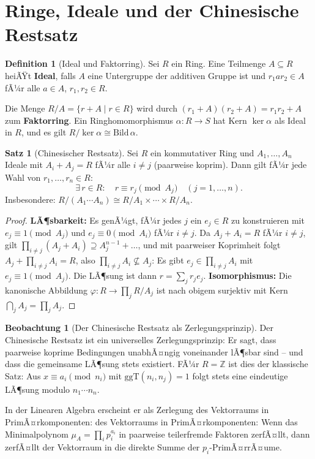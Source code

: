 ﻿\documentclass[a4paper,12pt]{report}
\theoremstyle{definition}
\newtheorem{definition}{Definition}
\newtheorem{satz}{Satz}
\newtheorem{beobachtung}{Beobachtung}
\begin{document}
\section{Ringe, Ideale und der Chinesische Restsatz}

\begin{definition}[Ideal und Faktorring]
    Sei $R$ ein Ring. Eine Teilmenge $A \subseteq R$ heiÃŸt \textbf{Ideal},
    falls $A$ eine Untergruppe der additiven Gruppe ist und
    $r_1 a r_2 \in A$ fÃ¼r alle $a \in A$, $r_1, r_2 \in R$.

    Die Menge $R/A = \{r + A \mid r \in R\}$ wird durch
    $(r_1 + A)(r_2 + A) = r_1 r_2 + A$ zum \textbf{Faktorring}.
    Ein Ringhomomorphismus $\alpha : R \to S$ hat Kern $\ker \alpha$
    als Ideal in $R$, und es gilt $R/\ker\alpha \cong \mathrm{Bild}\,\alpha$.
\end{definition}

\begin{satz}[Chinesischer Restsatz]
    Sei $R$ ein kommutativer Ring und $A_1, \dots, A_n$ Ideale mit
    $A_i + A_j = R$ fÃ¼r alle $i \neq j$ (paarweise koprim).
    Dann gilt fÃ¼r jede Wahl von $r_1, \dots, r_n \in R$:
    \[
        \exists\, r \in R : \quad r \equiv r_j \pmod{A_j}
        \quad (j = 1, \dots, n).
    \]
    Insbesondere: $R / (A_1 \cdots A_n) \cong R/A_1 \times \cdots \times R/A_n$.
\end{satz}
\begin{proof}
    \textbf{LÃ¶sbarkeit:} Es genÃ¼gt, fÃ¼r jedes $j$ ein $e_j \in R$ zu konstruieren
    mit $e_j \equiv 1 \pmod{A_j}$ und $e_j \equiv 0 \pmod{A_i}$ fÃ¼r $i \neq j$.
    Da $A_j + A_i = R$ fÃ¼r $i \neq j$, gilt $\prod_{i \neq j} (A_j + A_i) \supseteq A_j^{n-1} + \ldots$,
    und mit paarweiser Koprimheit folgt $A_j + \prod_{i \neq j} A_i = R$,
    also $\prod_{i \neq j} A_i \not\subseteq A_j$: Es gibt $e_j \in \prod_{i \neq j} A_i$
    mit $e_j \equiv 1 \pmod{A_j}$. Die LÃ¶sung ist dann $r = \sum_j r_j e_j$.
    \textbf{Isomorphismus:} Die kanonische Abbildung $\varphi : R \to \prod_j R/A_j$
    ist nach obigem surjektiv mit Kern $\bigcap_j A_j = \prod_j A_j$.
\end{proof}


\begin{beobachtung}[Der Chinesische Restsatz als Zerlegungsprinzip]
    Der Chinesische Restsatz ist ein universelles Zerlegungsprinzip:
    Er sagt, dass paarweise koprime Bedingungen unabhÃ¤ngig voneinander
    lÃ¶sbar sind -- und dass die gemeinsame LÃ¶sung stets existiert.
    FÃ¼r $R = \mathbb{Z}$ ist dies der klassische Satz: Aus
    $x \equiv a_i \pmod{n_i}$ mit $\mathrm{ggT}(n_i, n_j) = 1$ folgt
    stets eine eindeutige LÃ¶sung modulo $n_1 \cdots n_n$.

    In der Linearen Algebra erscheint er als Zerlegung
    des Vektorraums in PrimÃ¤r\-kom\-po\-nen\-ten:
    des Vektorraums in PrimÃ¤r\-komponenten: Wenn das Minimalpolynom
    $\mu_A = \prod_i p_i^{a_i}$ in paarweise teilerfremde Faktoren
    zerfÃ¤llt, dann zerfÃ¤llt der Vektorraum
    in die direkte Summe der $p_i$-PrimÃ¤r\-rÃ¤ume.
\end{beobachtung}
\end{document}
